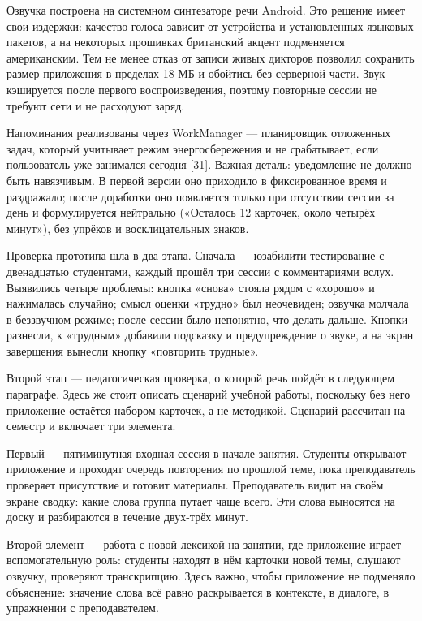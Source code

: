 \documentclass[11pt,a4paper,openany]{report}
\begin{document}
Озвучка построена на системном синтезаторе речи Android. Это решение имеет свои издержки: качество голоса зависит от устройства и установленных языковых пакетов, а на некоторых прошивках британский акцент подменяется американским. Тем не менее отказ от записи живых дикторов позволил сохранить размер приложения в пределах 18 МБ и обойтись без серверной части. Звук кэшируется после первого воспроизведения, поэтому повторные сессии не требуют сети и не расходуют заряд.

Напоминания реализованы через WorkManager — планировщик отложенных задач, который учитывает режим энергосбережения и не срабатывает, если пользователь уже занимался сегодня [31]. Важная деталь: уведомление не должно быть навязчивым. В первой версии оно приходило в фиксированное время и раздражало; после доработки оно появляется только при отсутствии сессии за день и формулируется нейтрально («Осталось 12 карточек, около четырёх минут»), без упрёков и восклицательных знаков.

Проверка прототипа шла в два этапа. Сначала — юзабилити-тестирование с двенадцатью студентами, каждый прошёл три сессии с комментариями вслух. Выявились четыре проблемы: кнопка «снова» стояла рядом с «хорошо» и нажималась случайно; смысл оценки «трудно» был неочевиден; озвучка молчала в беззвучном режиме; после сессии было непонятно, что делать дальше. Кнопки разнесли, к «трудным» добавили подсказку и предупреждение о звуке, а на экран завершения вынесли кнопку «повторить трудные».

Второй этап — педагогическая проверка, о которой речь пойдёт в следующем параграфе. Здесь же стоит описать сценарий учебной работы, поскольку без него приложение остаётся набором карточек, а не методикой. Сценарий рассчитан на семестр и включает три элемента.

Первый — пятиминутная входная сессия в начале занятия. Студенты открывают приложение и проходят очередь повторения по прошлой теме, пока преподаватель проверяет присутствие и готовит материалы. Преподаватель видит на своём экране сводку: какие слова группа путает чаще всего. Эти слова выносятся на доску и разбираются в течение двух-трёх минут.

Второй элемент — работа с новой лексикой на занятии, где приложение играет вспомогательную роль: студенты находят в нём карточки новой темы, слушают озвучку, проверяют транскрипцию. Здесь важно, чтобы приложение не подменяло объяснение: значение слова всё равно раскрывается в контексте, в диалоге, в упражнении с преподавателем.
\end{document}
